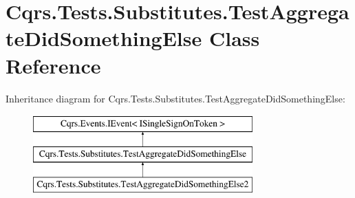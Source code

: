 \hypertarget{classCqrs_1_1Tests_1_1Substitutes_1_1TestAggregateDidSomethingElse}{}\section{Cqrs.\+Tests.\+Substitutes.\+Test\+Aggregate\+Did\+Something\+Else Class Reference}
\label{classCqrs_1_1Tests_1_1Substitutes_1_1TestAggregateDidSomethingElse}
Inheritance diagram for Cqrs.\+Tests.\+Substitutes.\+Test\+Aggregate\+Did\+Something\+Else\+:\begin{figure}[H]
\begin{center}
\leavevmode
\includegraphics[height=3.000000cm]{classCqrs_1_1Tests_1_1Substitutes_1_1TestAggregateDidSomethingElse}
\end{center}
\end{figure}
